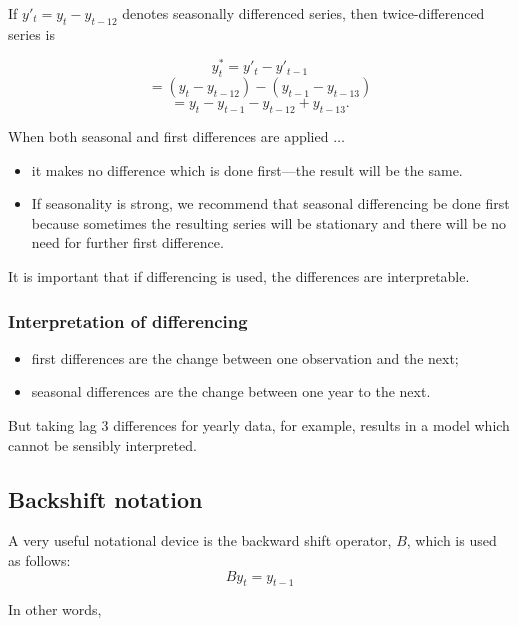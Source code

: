 \documentclass[]{book}
\providecommand{\tightlist}{%
  \setlength{\itemsep}{0pt}\setlength{\parskip}{0pt}}
\begin{document}
If \(y'_t = y_t - y_{t-12}\) denotes seasonally differenced series, then twice-differenced series is

\[y^*_t = y'_t - y'_{t-1}\]
\[= (y_t - y_{t-12}) - (y_{t-1} - y_{t-13})\]
\[= y_t - y_{t-1} - y_{t-12} + y_{t-13}.\]

When both seasonal and first differences are applied \(\dots\)

\begin{itemize}
\tightlist
\item
  it makes no difference which is done first---the result will be the same.
\item
  If seasonality is strong, we recommend that seasonal differencing be done first because sometimes the resulting series will be stationary and there will be no need for further first difference.
\end{itemize}

It is important that if differencing is used, the differences are interpretable.

\hypertarget{interpretation-of-differencing}{%
\subsubsection{Interpretation of differencing}\label{interpretation-of-differencing}}

\begin{itemize}
\tightlist
\item
  first differences are the change between one observation and the next;
\item
  seasonal differences are the change between one year to the next.
\end{itemize}

But taking lag 3 differences for yearly data, for example, results in a model which cannot be sensibly interpreted.

\hypertarget{backshift-notation}{%
\subsection{Backshift notation}\label{backshift-notation}}

A very useful notational device is the backward shift operator, \(B\), which is used as follows:
\[B y_{t} = y_{t - 1}\]

In other words,
\end{document}
